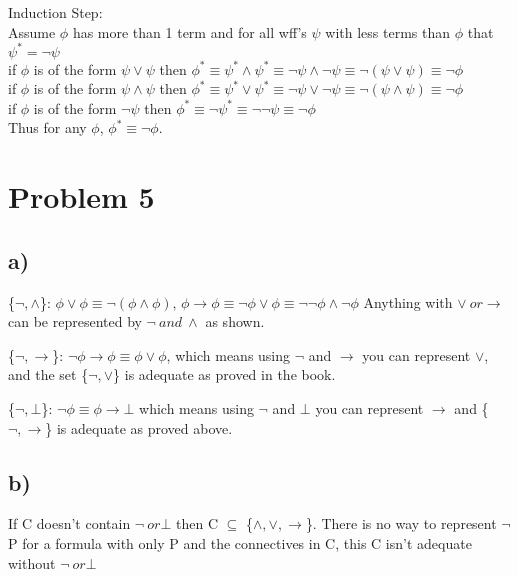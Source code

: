 \documentclass[12pt,leqno,fleqn]{article}
\begin{document}
Induction Step: \\
Assume $\phi$ has more than 1 term and for all wff's $\psi$ with less terms than $\phi$ that $\psi^* = \neg \psi$\\
if $\phi$ is of the form $\psi \lor \psi$ then $\phi^* \equiv \psi^* \land \psi^* \equiv \neg \psi \land \neg \psi \equiv \neg (\psi \lor \psi) \equiv \neg \phi$ \\
if $\phi$ is of the form $\psi \land \psi$ then $\phi^* \equiv \psi^* \lor \psi^* \equiv \neg \psi \lor \neg \psi \equiv \neg (\psi \land \psi) \equiv \neg \phi$ \\
if $\phi$ is of the form $\neg \psi$ then $\phi^* \equiv \neg \psi^* \equiv \neg \neg \psi \equiv \neg \phi$ \\

Thus for any $\phi$, $\phi^* \equiv \neg \phi$.\\

\section{Problem 5}
\subsection{a)}
\{$\neg, \land$\}: $\phi \lor \phi \equiv \neg (\phi \land \phi)$, $\phi \to \phi \equiv \neg \phi \lor \phi \equiv \neg \neg \phi \land \neg \phi$ Anything with $\lor\  or \to$ can be represented by $\neg\  and\  \land$ as shown.

\{$\neg, \to$\}: $\neg \phi \to \phi \equiv \phi \lor \phi$, which means using $\neg$ and $\to$ you can represent $\lor$, and the set \{$\neg, \lor$\} is adequate as proved in the book.

\{$\neg, \bot$\}: $\neg \phi \equiv \phi \to \bot$ which means using $\neg$ and $\bot$ you can represent $\to$  and \{$\neg, \to$\} is adequate as proved above.
\subsection{b)}
If C doesn't contain $\neg \ or \bot$ then C $\subseteq$ \{$\land, \lor, \to$\}. There is no way to represent $\neg$ P for a formula with only P and the connectives in C, this C isn't adequate without $\neg \ or \bot$
\end{document}
